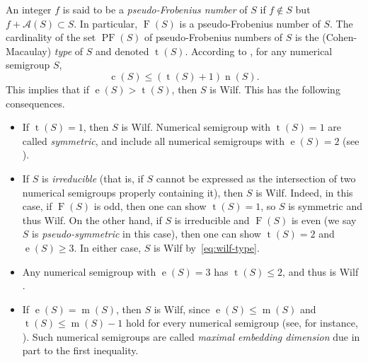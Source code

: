 \documentclass[12pt]{amsart}
\theoremstyle{definition}
\numberwithin{equation}{section}
\renewcommand\>{\rangle}
\newcommand\<{\langle}
\newcommand\0{\mathbf{0}}
\begin{document}
An integer $f$ is said to be a \emph{pseudo-Frobenius number} of $S$ if $f \notin S$ but $f + \mathcal A(S) \subset S$.  In particular, $\operatorname F(S)$ is a pseudo-Frobenius number of $S$. The cardinality of the set $\operatorname{PF}(S)$ of pseudo-Frobenius numbers of $S$ is the (Cohen-Macaulay) \emph{type} of $S$ and denoted $\operatorname t(S)$.  According to \cite[Theorem 20]{f-g-h}, for any numerical semigroup $S$, 
\begin{equation}\label{eq:wilf-type}
\operatorname c(S) \le (\operatorname t(S) + 1)\operatorname n(S).
\end{equation}
This implies that if $\operatorname e(S) > \operatorname t(S)$, then $S$ is Wilf.  This has the following consequences.
\begin{itemize}
\item 
If $\operatorname t(S) = 1$, then $S$ is Wilf.  Numerical semigroup with $\operatorname t(S) = 1$ are called \emph{symmetric}, and include all numerical semigroups with $\operatorname e(S) = 2$ (see \cite{f-g-h,numerical}).  

\item 
If $S$ is \emph{irreducible} (that is, if $S$ cannot be expressed as the intersection of two numerical semigroups properly containing it), then $S$ is Wilf.  Indeed, in this case, if $\operatorname F(S)$ is odd, then one can show $\operatorname t(S) = 1$, so $S$ is symmetric and thus Wilf.  On the other hand, if $S$ is irreducible and $\operatorname F(S)$ is even (we say $S$ is \emph{pseudo-symmetric} in this case), then one can show $\operatorname t(S) = 2$ and $\operatorname e(S) \ge 3$.  In either case, $S$ is Wilf by~\eqref{eq:wilf-type}.  

\item 
Any numerical semigroup with $\operatorname e(S) = 3$ has $\operatorname t(S) \le 2$, and thus is Wilf \cite[Chapter~1]{numerical}. 

\item 
If $\operatorname e(S) = \operatorname m(S)$, then $S$ is Wilf, since $\operatorname e(S) \le \operatorname m(S)$ and $\operatorname t(S) \le \operatorname m(S) - 1$ hold for every numerical semigroup (see, for instance, \cite[Chapter 1]{numerical}).  Such numerical semigroups are called \emph{maximal embedding dimension} due in part to the first inequality.	
\end{itemize}
\end{document}
